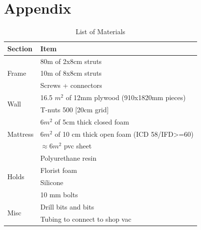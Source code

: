 \documentclass[a4paper, 12pt]{scrartcl}
\begin{document}
\newpage
\section*{Appendix}
\begin{figure}[ht]
\end{figure}


\begin{table}[ht]
\centering
\caption{List of Materials}
\label{material}
\begin{tabular}{l l}
\toprule[2pt]
Section & Item\\
\midrule
\multirow{3}{*}{Frame} & 80m of 2x8cm struts \\
	& 10m of 8x8cm struts \\
	& Screws + connectors \\
\midrule
\multirow{2}{*}{Wall} & 16.5 $m^2$ of 12mm plywood (910x1820mm pieces)\\
	& T-nuts 500 [20cm grid] \\
\midrule
\multirow{3}{*}{Mattress} & 6$m^2$ of 5cm thick closed foam\\
	& 6$m^2$ of 10 cm thick open foam (ICD 58/IFD>=60)\\
	& $\approx$6$m^2$ pvc sheet\\
\midrule
\multirow{4}{*}{Holds} & Polyurethane resin\\
	& Florist foam\\
	& Silicone\\
	& 10 mm bolts\\
	\midrule
\multirow{2}{*}{Misc} &  Drill bits and bits\\
	& Tubing to connect to shop vac\\
\bottomrule[2pt]
\end{tabular}
\end{table}
\end{document}
